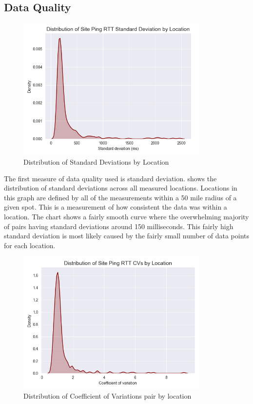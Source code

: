 \subsection{Data Quality}

\begin{figure}[h]
    \centering
    \includegraphics[width=0.85\textwidth]{images/siteping/siteping_rtt_stdev_distribution.png}
    \caption{Distribution of Standard Deviations by Location}
    \label{fig:siteping_stdeva_distro}
\end{figure}

The first measure of data quality used is standard deviation.  shows the distribution of standard deviations across all measured locations. Locations in this graph are defined by all of the measurements within a 50 mile radius of a given spot. This is a measurement of how consistent the data was within a location.   The chart shows a fairly smooth curve where the overwhelming majority of pairs having standard deviations around 150 milliseconds. This fairly high standard deviation is most likely caused by the fairly small number of data points for each location.

\begin{figure}[H]
    \centering
    \includegraphics[width=0.85\textwidth]{images/siteping/siteping_rtt_cv_distribution.png}
    \caption{Distribution of Coefficient of Variations pair by location}
    \label{fig:siteping_cv}
\end{figure}

